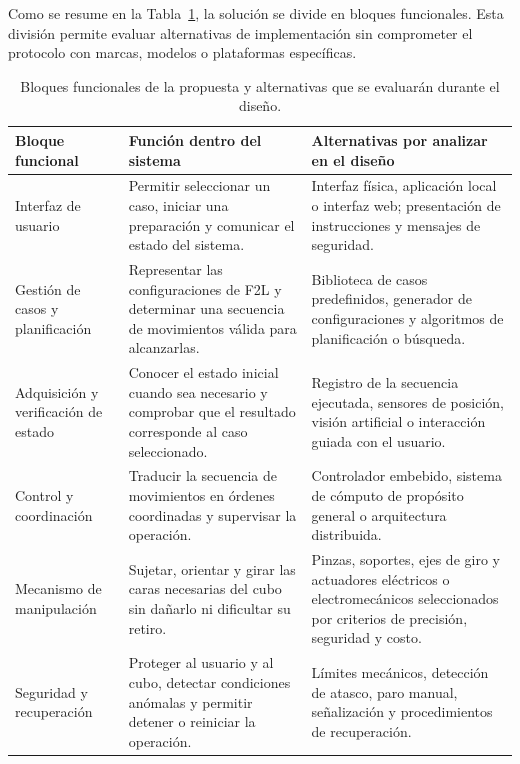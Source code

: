 Como se resume en la Tabla~\ref{tab:bloques-propuesta}, la solución se divide en bloques funcionales. Esta división permite evaluar alternativas de implementación sin comprometer el protocolo con marcas, modelos o plataformas específicas.

\begin{table}[H]
\centering
\small
\renewcommand{\arraystretch}{1.2}
\begin{tabularx}{\textwidth}{|p{3.2cm}|X|X|}
\hline
\textbf{Bloque funcional} & \textbf{Función dentro del sistema} & \textbf{Alternativas por analizar en el diseño} \\ \hline
Interfaz de usuario & Permitir seleccionar un caso, iniciar una preparación y comunicar el estado del sistema. & Interfaz física, aplicación local o interfaz web; presentación de instrucciones y mensajes de seguridad. \\ \hline
Gestión de casos y planificación & Representar las configuraciones de F2L y determinar una secuencia de movimientos válida para alcanzarlas. & Biblioteca de casos predefinidos, generador de configuraciones y algoritmos de planificación o búsqueda. \\ \hline
Adquisición y verificación de estado & Conocer el estado inicial cuando sea necesario y comprobar que el resultado corresponde al caso seleccionado. & Registro de la secuencia ejecutada, sensores de posición, visión artificial o interacción guiada con el usuario. \\ \hline
Control y coordinación & Traducir la secuencia de movimientos en órdenes coordinadas y supervisar la operación. & Controlador embebido, sistema de cómputo de propósito general o arquitectura distribuida. \\ \hline
Mecanismo de manipulación & Sujetar, orientar y girar las caras necesarias del cubo sin dañarlo ni dificultar su retiro. & Pinzas, soportes, ejes de giro y actuadores eléctricos o electromecánicos seleccionados por criterios de precisión, seguridad y costo. \\ \hline
Seguridad y recuperación & Proteger al usuario y al cubo, detectar condiciones anómalas y permitir detener o reiniciar la operación. & Límites mecánicos, detección de atasco, paro manual, señalización y procedimientos de recuperación. \\ \hline
\end{tabularx}
\caption{Bloques funcionales de la propuesta y alternativas que se evaluarán durante el diseño.}
\label{tab:bloques-propuesta}
\end{table}

